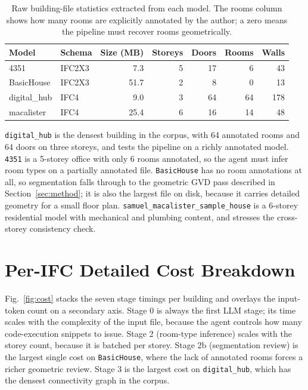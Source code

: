 \documentclass[a4paper, 10pt, conference]{ieeeconf}
\begin{document}
\begin{table}[h]
\centering
\caption{Raw building-file statistics extracted from each model. The rooms column shows how many rooms are explicitly annotated by the author; a zero means the pipeline must recover rooms geometrically.}
\label{tab:corpus_stats}
\footnotesize
\setlength{\tabcolsep}{3pt}
\begin{tabular}{@{}l l r r r r r@{}}
\toprule
Model & Schema & Size (MB) & Storeys & Doors & Rooms & Walls \\
\midrule
4351         & IFC2X3 & 7.3  & 5 & 17 & 6  & 43  \\
BasicHouse   & IFC2X3 & 51.7 & 2 & 8  & 0  & 13  \\
digital\_hub & IFC4   & 9.0  & 3 & 64 & 64 & 178 \\
macalister   & IFC4   & 25.4 & 6 & 16 & 14 & 48  \\
\bottomrule
\end{tabular}
\end{table}

\texttt{digital\_hub} is the densest building in the corpus, with 64 annotated rooms and 64 doors on three storeys, and tests the pipeline on a richly annotated model. \texttt{4351} is a 5-storey office with only 6 rooms annotated, so the agent must infer room types on a partially annotated file. \texttt{BasicHouse} has no room annotations at all, so segmentation falls through to the geometric GVD pass described in Section~\ref{sec:method}; it is also the largest file on disk, because it carries detailed geometry for a small floor plan. \texttt{samuel\_macalister\_sample\_house} is a 6-storey residential model with mechanical and plumbing content, and stresses the cross-storey consistency check.

\section{Per-IFC Detailed Cost Breakdown}
\label{app:perifc}

Fig.~\ref{fig:cost} stacks the seven stage timings per building and overlays the input-token count on a secondary axis. Stage 0 is always the first LLM stage; its time scales with the complexity of the input file, because the agent controls how many code-execution snippets to issue. Stage 2 (room-type inference) scales with the storey count, because it is batched per storey. Stage 2b (segmentation review) is the largest single cost on \texttt{BasicHouse}, where the lack of annotated rooms forces a richer geometric review. Stage 3 is the largest cost on \texttt{digital\_hub}, which has the densest connectivity graph in the corpus.
\end{document}
